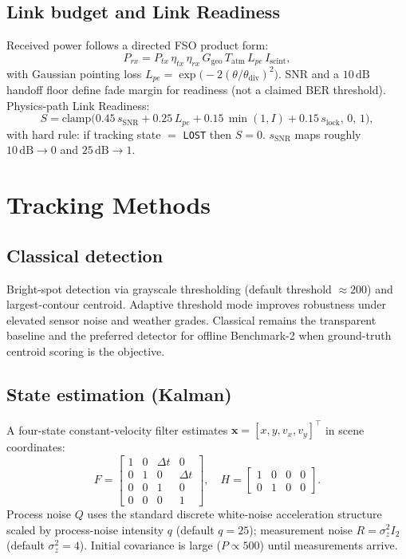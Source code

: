 \documentclass[11pt,a4paper]{article}
\begin{document}
\subsection{Link budget and Link Readiness}
Received power follows a directed FSO product form:
\begin{equation}
P_{rx}
=
P_{tx}\,
\eta_{tx}\,
\eta_{rx}\,
G_{\mathrm{geo}}\,
T_{\mathrm{atm}}\,
L_{pe}\,
I_{\mathrm{scint}},
\end{equation}
with Gaussian pointing loss $L_{pe}=\exp\!\bigl(-2(\theta/\theta_{\mathrm{div}})^2\bigr)$.
SNR and a $10\,\mathrm{dB}$ handoff floor define fade margin for readiness (not a claimed BER threshold).
Physics-path Link Readiness:
\begin{equation}
S
=
\mathrm{clamp}\!\big(
0.45\,s_{\mathrm{SNR}}
+
0.25\,L_{pe}
+
0.15\,\min(1,I)
+
0.15\,s_{\mathrm{lock}}
,\,0,\,1\big),
\end{equation}
with hard rule: if tracking state $=$ \texttt{LOST} then $S=0$.
$s_{\mathrm{SNR}}$ maps roughly $10\,\mathrm{dB}\rightarrow 0$ and $25\,\mathrm{dB}\rightarrow 1$.

\section{Tracking Methods}

\subsection{Classical detection}
Bright-spot detection via grayscale thresholding (default threshold $\approx 200$) and largest-contour centroid.
Adaptive threshold mode improves robustness under elevated sensor noise and weather grades.
Classical remains the transparent baseline and the preferred detector for offline Benchmark-2 when ground-truth centroid scoring is the objective.

\subsection{State estimation (Kalman)}
A four-state constant-velocity filter estimates $\mathbf{x}=[x,y,v_x,v_y]^\top$ in scene coordinates:
\begin{equation}
F
=
\begin{bmatrix}
1 & 0 & \Delta t & 0\\
0 & 1 & 0 & \Delta t\\
0 & 0 & 1 & 0\\
0 & 0 & 0 & 1
\end{bmatrix},
\quad
H
=
\begin{bmatrix}
1 & 0 & 0 & 0\\
0 & 1 & 0 & 0
\end{bmatrix}.
\end{equation}
Process noise $Q$ uses the standard discrete white-noise acceleration structure scaled by process-noise intensity $q$ (default $q=25$); measurement noise $R=\sigma_z^2 I_2$ (default $\sigma_z^2=4$).
Initial covariance is large ($P\propto 500$) until measurements arrive.
\end{document}

